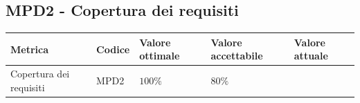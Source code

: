 \subsection{MPD2 - Copertura dei requisiti}
\label{s:mpc11}
\begin{table}[H]
    \centering
    \begin{tabularx}{\textwidth}{p{5.5cm}|X|l|l|l}
        \hline
		\textbf{Metrica} & \textbf{Codice} & \textbf{Valore ottimale} & \textbf{Valore accettabile}  & \textbf{Valore attuale} \\
        \hline
        Copertura dei requisiti & MPD2 &  $100\%$ & $80\%$  &   \\
    \end{tabularx}
\end{table}
